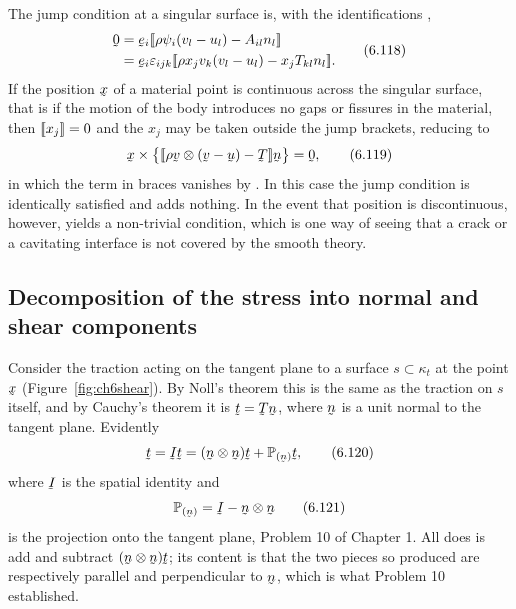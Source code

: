 The jump condition  at a singular surface is, with the
identifications ,
\begin{equation}
\begin{aligned}
   \bze&=\be_{i}\jump{\rho\psi_{i}(v_{l}-u_{l})-A_{il}n_{l}}\\
   &=\be_{i}\eps_{ijk}
     \jump{\rho x_{j}v_{k}(v_{l}-u_{l})-x_{j}T_{kl}n_{l}} .
\end{aligned}
   \tag{6.118}\label{eq:6.118}
\end{equation}
If the position $\bx$ of a material point is continuous across the
singular surface, that is if the motion of the body introduces no gaps
or fissures in the material, then $[\![x_{j}]\!]=0$ and the $x_{j}$ may
be taken outside the jump brackets, reducing  to
\begin{equation}
   \bx\times\big\{\jump{\rho\bv\otimes(\bv-\bu)-\bT}\bn\big\}=\bze ,
   \tag{6.119}\label{eq:6.119}
\end{equation}
in which the term in braces vanishes by . In this case the
jump condition is identically satisfied and adds nothing. In the event
that position is discontinuous, however,  yields a
non-trivial condition, which is one way of seeing that a crack or a
cavitating interface is not covered by the smooth theory.

\subsection{Decomposition of the stress into normal and shear
components}\label{sec:ch6normshear}

Consider the traction acting on the tangent plane to a surface
$s\subset\kappa_{t}$ at the point $\bx$ (Figure~\ref{fig:ch6shear}).
By Noll's theorem this is the same as the traction on $s$ itself, and
by Cauchy's theorem it is $\bt=\bT\bn$, where $\bn$ is a unit normal to
the tangent plane. Evidently
\begin{equation}
   \bt=\I\bt=(\bn\otimes\bn)\bt+\Proj\bn\bt ,
   \tag{6.120}\label{eq:6.120}
\end{equation}
where $\I$ is the spatial identity and
\begin{equation}
   \Proj\bn=\I-\bn\otimes\bn
   \tag{6.121}\label{eq:6.121}
\end{equation}
is the projection onto the tangent plane, Problem 10 of Chapter 1. All
 does is add and subtract $(\bn\otimes\bn)\bt$; its content
is that the two pieces so produced are respectively parallel and
perpendicular to $\bn$, which is what Problem 10 established.

